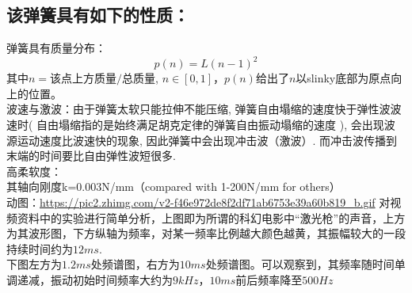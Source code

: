\documentclass[UTF8,9pt]{report}
\begin{document}
\subsection*{该弹簧具有如下的性质：}
弹簧具有质量分布：
    $$p(n)=L(n-1)^2$$
    其中$n=\text{该点上方质量/总质量}  $, $n \in [0,1]$，$p(n)$给出了$n$以slinky底部为原点向上的位置。\\
波速与激波：由于弹簧太软只能拉伸不能压缩, 弹簧自由塌缩的速度快于弹性波波速时( 自由塌缩指的是始终满足胡克定律的弹簧自由振动塌缩的速度 ), 会出现波源运动速度比波速快的现象, 因此弹簧中会出现冲击波（激波）. 而冲击波传播到末端的时间要比自由弹性波短很多.\\
高柔软度：\\
    其轴向刚度k=0.003N/mm（compared with 1-200N/mm for others）\\
    动图：\url{https://pic2.zhimg.com/v2-f46e972de8f2df71ab6753e39a60b819_b.gif}
    对视频资料中的实验进行简单分析，上图即为所谓的科幻电影中“激光枪”的声音，上方为其波形图，下方纵轴为频率，对某一频率比例越大颜色越黄，其振幅较大的一段持续时间约为$12ms$.\\
    下图左方为$1.2ms$处频谱图，右方为$10ms$处频谱图。可以观察到，其频率随时间单调递减，振动初始时间频率大约为$9kHz$，$10ms$前后频率降至$500Hz$\\
\end{document}
